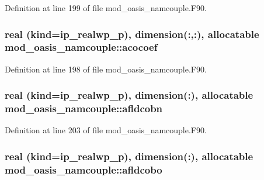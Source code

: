 Definition at line 199 of file mod\+\_\+oasis\+\_\+namcouple.\+F90.

\hypertarget{classmod__oasis__namcouple_a115cdfe0e05679107363605a992c6386}{
\subsubsection[{acocoef}]{\setlength{\rightskip}{0pt plus 5cm}real (kind=ip\+\_\+realwp\+\_\+p), dimension(\+:,\+:), allocatable mod\+\_\+oasis\+\_\+namcouple\+::acocoef\hspace{0.3cm}{\ttfamily [private]}}}\label{classmod__oasis__namcouple_a115cdfe0e05679107363605a992c6386}


Definition at line 198 of file mod\+\_\+oasis\+\_\+namcouple.\+F90.

\hypertarget{classmod__oasis__namcouple_a207709166cd4d719d65d76e6c043fd6c}{
\subsubsection[{afldcobn}]{\setlength{\rightskip}{0pt plus 5cm}real (kind=ip\+\_\+realwp\+\_\+p), dimension(\+:), allocatable mod\+\_\+oasis\+\_\+namcouple\+::afldcobn\hspace{0.3cm}{\ttfamily [private]}}}\label{classmod__oasis__namcouple_a207709166cd4d719d65d76e6c043fd6c}


Definition at line 203 of file mod\+\_\+oasis\+\_\+namcouple.\+F90.

\hypertarget{classmod__oasis__namcouple_aa9d178659282698ffb6c186ff48bed3c}{
\subsubsection[{afldcobo}]{\setlength{\rightskip}{0pt plus 5cm}real (kind=ip\+\_\+realwp\+\_\+p), dimension(\+:), allocatable mod\+\_\+oasis\+\_\+namcouple\+::afldcobo\hspace{0.3cm}{\ttfamily [private]}}}\label{classmod__oasis__namcouple_aa9d178659282698ffb6c186ff48bed3c}



